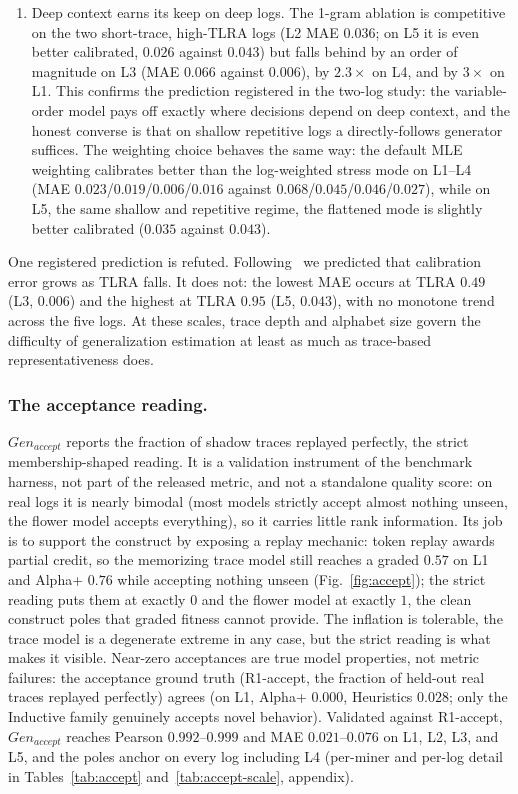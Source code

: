 \documentclass[runningheads]{llncs}
\newcommand{\genaccept}{\ensuremath{\mathit{Gen}_{\mathit{accept}}}}
\begin{document}
\begin{enumerate}
  \item Deep context earns its keep on deep logs. The 1-gram ablation is competitive on the two short-trace, high-TLRA logs (L2 MAE $0.036$; on L5 it is even better calibrated, $0.026$ against $0.043$) but falls behind by an order of magnitude on L3 (MAE $0.066$ against $0.006$), by $2.3\times$ on L4, and by $3\times$ on L1. This confirms the prediction registered in the two-log study: the variable-order model pays off exactly where decisions depend on deep context, and the honest converse is that on shallow repetitive logs a directly-follows generator suffices. The weighting choice behaves the same way: the default MLE weighting calibrates better than the log-weighted stress mode on L1--L4 (MAE $0.023$/$0.019$/$0.006$/$0.016$ against $0.068$/$0.045$/$0.046$/$0.027$), while on L5, the same shallow and repetitive regime, the flattened mode is slightly better calibrated ($0.035$ against $0.043$).\end{enumerate}

One registered prediction is refuted. Following~\cite{karunaratne2024representativeness} we predicted that calibration error grows as TLRA falls. It does not: the lowest MAE occurs at TLRA $0.49$ (L3, $0.006$) and the highest at TLRA $0.95$ (L5, $0.043$), with no monotone trend across the five logs. At these scales, trace depth and alphabet size govern the difficulty of generalization estimation at least as much as trace-based representativeness does.

\subsubsection{The acceptance reading.}
\label{sec:eval:accept}
\genaccept{} reports the fraction of shadow traces replayed perfectly, the strict membership-shaped reading. It is a validation instrument of the benchmark harness, not part of the released metric, and not a standalone quality score: on real logs it is nearly bimodal (most models strictly accept almost nothing unseen, the flower model accepts everything), so it carries little rank information. Its job is to support the construct by exposing a replay mechanic: token replay awards partial credit, so the memorizing trace model still reaches a graded $0.57$ on L1 and Alpha+ $0.76$ while accepting nothing unseen (Fig.~\ref{fig:accept}); the strict reading puts them at exactly $0$ and the flower model at exactly $1$, the clean construct poles that graded fitness cannot provide. The inflation is tolerable, the trace model is a degenerate extreme in any case, but the strict reading is what makes it visible. Near-zero acceptances are true model properties, not metric failures: the acceptance ground truth (R1-accept, the fraction of held-out real traces replayed perfectly) agrees (on L1, Alpha+ $0.000$, Heuristics $0.028$; only the Inductive family genuinely accepts novel behavior). Validated against R1-accept, \genaccept{} reaches Pearson $0.992$--$0.999$ and MAE $0.021$--$0.076$ on L1, L2, L3, and L5, and the poles anchor on every log including L4 (per-miner and per-log detail in Tables~\ref{tab:accept} and~\ref{tab:accept-scale}, appendix).
\end{document}
